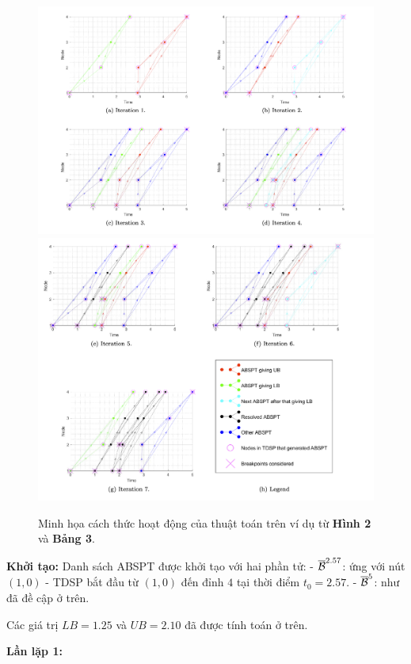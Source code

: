 \documentclass[../main.tex]{subfiles}
\begin{document}
\begin{figure}
\centering
\includegraphics{images/Figure6a.png}
\includegraphics{images/Figure6b.png}
\caption{Minh họa cách thức hoạt động của thuật toán trên ví dụ
từ \textbf{Hình 2} và \textbf{Bảng 3}.}
\label{fig:6_ab}
\end{figure}

\textbf{Khởi tạo:} Danh sách ABSPT được khởi tạo với hai phần tử: -
\(\overline{\cal B}^{2.57}\): ứng với nút \((1, 0)\) - TDSP bắt đầu từ
\((1, 0)\) đến đỉnh \(4\) tại thời điểm \(t_0 = 2.57\). -
\(\overline{\cal B}^{5}\): như đã đề cập ở trên.

Các giá trị \(LB=1.25\) và \(UB=2.10\) đã được tính toán ở trên.

\textbf{Lần lặp 1:}
\end{document}
